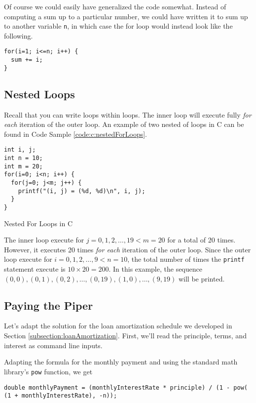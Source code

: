 Of course we could easily have generalized the code somewhat.  Instead of computing
a sum up to a particular number, we could have written it to sum up to another
variable \texttt{n}, in which case the for loop would instead look like the
following.

\begin{verbatim}
for(i=1; i<=n; i++) {
  sum += i;
}
\end{verbatim}

\subsection{Nested Loops}

Recall that you can write loops within loops.  The inner loop will execute fully 
\emph{for each} iteration of the outer loop.  An example of two nested of
loops in C can be found in Code Sample \ref{code:c:nestedForLoops}.

\begin{listing}[H]
\begin{verbatim}
int i, j;
int n = 10;
int m = 20;
for(i=0; i<n; i++) {
  for(j=0; j<m; j++) {
    printf("(i, j) = (%d, %d)\n", i, j);
  }
}
\end{verbatim}
  \caption{Nested For Loops in C}
  \label{code:c:nestedForLoops}
\end{listing}

The inner loop execute for $j = 0, 1, 2, \ldots, 19 < m = 20$ for a total
of 20 times.  However, it executes 20 times \emph{for each} iteration of
the outer loop.  Since the outer loop execute for $i = 0, 1, 2, \ldots, 9 < n = 10$, 
the total number of times the \texttt{printf} statement execute is
$10 \times 20 = 200$.  In this example, the sequence $(0, 0), (0, 1), (0, 2), \ldots, (0,19), (1, 0), \ldots, (9, 19)$
will be printed.

\subsection{Paying the Piper}

Let's adapt the solution for the loan amortization schedule we developed in 
Section \ref{subsection:loanAmortization}.  First, we'll read the principle, 
terms, and interest as command line inputs.

Adapting the formula for the monthly payment and using the standard
math library's \texttt{pow} function, we get

\texttt{double monthlyPayment = (monthlyInterestRate * principle) / (1 - pow( (1 + monthlyInterestRate), -n));}

